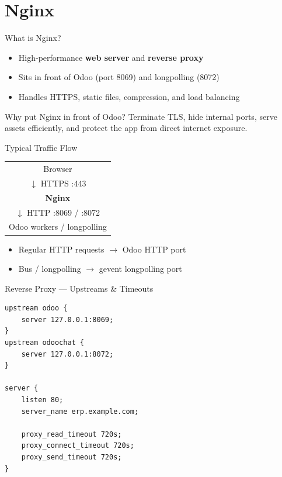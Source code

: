 \section{Nginx}

\begin{frame}{What is Nginx?}
\begin{itemize}
  \item High-performance \textbf{web server} and \textbf{reverse proxy}
  \item Sits in front of Odoo (port 8069) and longpolling (8072)
  \item Handles HTTPS, static files, compression, and load balancing
\end{itemize}

\vspace{0.5em}
\begin{block}{Why put Nginx in front of Odoo?}
  Terminate TLS, hide internal ports, serve assets efficiently, and protect the app from direct internet exposure.
\end{block}
\end{frame}

\begin{frame}{Typical Traffic Flow}
\begin{center}
\begin{tabular}{c}
Browser \\
$\downarrow$ HTTPS :443 \\
\textbf{Nginx} \\
$\downarrow$ HTTP :8069 / :8072 \\
Odoo workers / longpolling
\end{tabular}
\end{center}

\vspace{0.8em}
\begin{itemize}
  \item Regular HTTP requests $\rightarrow$ Odoo HTTP port
  \item Bus / longpolling $\rightarrow$ gevent longpolling port
\end{itemize}
\end{frame}

\begin{frame}[fragile]{Reverse Proxy --- Upstreams \& Timeouts}
\begin{lstlisting}[language={}]
upstream odoo {
    server 127.0.0.1:8069;
}
upstream odoochat {
    server 127.0.0.1:8072;
}

server {
    listen 80;
    server_name erp.example.com;

    proxy_read_timeout 720s;
    proxy_connect_timeout 720s;
    proxy_send_timeout 720s;
}
\end{lstlisting}
\end{frame}

